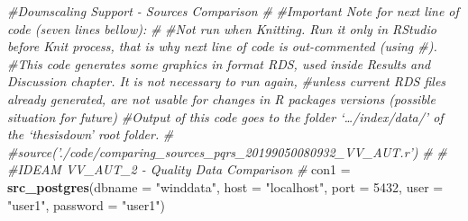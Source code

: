 \documentclass[12pt,oneside]{reedthesis}
\newenvironment{Shaded}{\begin{snugshade}}{\end{snugshade}}
\newcommand{\CommentTok}[1]{\textcolor[rgb]{0.56,0.35,0.01}{\textit{#1}}}
\newcommand{\DataTypeTok}[1]{\textcolor[rgb]{0.13,0.29,0.53}{#1}}
\newcommand{\DecValTok}[1]{\textcolor[rgb]{0.00,0.00,0.81}{#1}}
\newcommand{\KeywordTok}[1]{\textcolor[rgb]{0.13,0.29,0.53}{\textbf{#1}}}
\newcommand{\NormalTok}[1]{#1}
\newcommand{\StringTok}[1]{\textcolor[rgb]{0.31,0.60,0.02}{#1}}
\begin{document}
\vspace{0.4cm}
\begin{Shaded}
\begin{Highlighting}[]
\CommentTok{#Downscaling Support - Sources Comparison}
\CommentTok{#}
\CommentTok{#Important Note for next line of code (seven lines bellow):}
\CommentTok{#}
\CommentTok{#Not run when Knitting. Run it only in RStudio before Knit process, that is why next line of code is out-commented (using #). }
\CommentTok{#This code generates some graphics in format RDS, used inside Results and Discussion chapter. It is not necessary to run again, }
\CommentTok{#unless current RDS files already generated, are not usable for changes in R packages versions (possible situation for future)}
\CommentTok{#Output of this code goes to the folder ‘…/index/data/’ of the ‘thesisdown’ root folder.}
\CommentTok{#}
\CommentTok{#source('./code/comparing_sources_pqrs_20199050080932_VV_AUT.r')}
\CommentTok{#}
\CommentTok{#}
\CommentTok{#IDEAM VV_AUT_2 - Quality Data Comparison}
\CommentTok{#}
\NormalTok{con1 =}\StringTok{ }\KeywordTok{src_postgres}\NormalTok{(}\DataTypeTok{dbname =} \StringTok{"winddata"}\NormalTok{, }\DataTypeTok{host =} \StringTok{"localhost"}\NormalTok{, }\DataTypeTok{port =} \DecValTok{5432}\NormalTok{, }\DataTypeTok{user =} \StringTok{"user1"}\NormalTok{, }\DataTypeTok{password =} \StringTok{"user1"}\NormalTok{)}


\end{Highlighting}
\end{Shaded}
\end{document}
